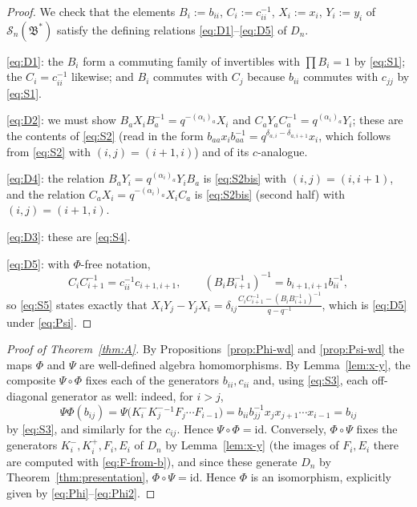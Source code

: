 \documentclass[11pt]{amsart}
\newcommand{\KP}{K^{+}}
\newcommand{\KM}{K^{-}}
\newcommand{\al}{\alpha}
\theoremstyle{plain}
\theoremstyle{definition}
\numberwithin{equation}{section}
\begin{document}
\begin{proof}
We check that the elements
$B_i:=b_{ii}$, $C_i:=c_{ii}^{-1}$, $X_i:=x_i$, $Y_i:=y_i$ of
$\mathscr S_n(\mathfrak B^*)$ satisfy the defining relations
\eqref{eq:D1}--\eqref{eq:D5} of $D_n$.

\eqref{eq:D1}: the $B_i$ form a commuting family of invertibles with
$\prod B_i=1$ by \eqref{eq:S1}; the $C_i=c_{ii}^{-1}$ likewise; and $B_i$
commutes with $C_j$ because $b_{ii}$ commutes with $c_{jj}$ by \eqref{eq:S1}.

\eqref{eq:D2}: we must show $B_aX_iB_a^{-1}=q^{-(\al_i)_a}X_i$ and
$C_aY_aC_a^{-1}=q^{(\al_i)_a}Y_i$; these are the contents of \eqref{eq:S2}
(read in the form $b_{aa}x_ib_{aa}^{-1}=q^{\delta_{a,i}-\delta_{a,i+1}}x_i$,
which follows from \eqref{eq:S2} with $(i,j)=(i+1,i)$) and of its
$c$-analogue.

\eqref{eq:D4}: the relation $B_aY_i=q^{(\al_i)_a}Y_iB_a$ is
\eqref{eq:S2bis} with $(i,j)=(i,i+1)$, and the relation
$C_aX_i=q^{-(\al_i)_a}X_iC_a$ is \eqref{eq:S2bis} (second half) with
$(i,j)=(i+1,i)$.

\eqref{eq:D3}: these are \eqref{eq:S4}.

\eqref{eq:D5}: with $\Phi$-free notation,
\[
C_iC_{i+1}^{-1}=c_{ii}^{-1}c_{i+1,i+1},\qquad
(B_iB_{i+1}^{-1})^{-1}=b_{i+1,i+1}b_{ii}^{-1},
\]
so \eqref{eq:S5} states exactly that
$X_iY_j-Y_jX_i=\delta_{ij}\frac{C_iC_{i+1}^{-1}-(B_iB_{i+1}^{-1})^{-1}}
{q-q^{-1}}$, which is \eqref{eq:D5} under \eqref{eq:Psi}.
\end{proof}

\begin{proof}[Proof of Theorem~\ref{thm:A}]
By Propositions~\ref{prop:Phi-wd} and \ref{prop:Psi-wd} the maps
$\Phi$ and $\Psi$ are well-defined algebra homomorphisms.  By
Lemma~\ref{lem:x-y}, the composite $\Psi\circ\Phi$ fixes each of the
generators $b_{ii},c_{ii}$ and, using \eqref{eq:S3}, each off-diagonal
generator as well: indeed, for $i>j$,
\[
\Psi\Phi(b_{ij})
=\Psi\big(\KM_i\KM_j^{-1}F_j\cdots F_{i-1}\big)
=b_{ii}b_{jj}^{-1}x_jx_{j+1}\cdots x_{i-1}=b_{ij}
\]
by \eqref{eq:S3}, and similarly for the $c_{ij}$.  Hence
$\Psi\circ\Phi=\mathrm{id}$.  Conversely, $\Phi\circ\Psi$ fixes the
generators $\KM_i,\KP_i,F_i,E_i$ of $D_n$ by Lemma~\ref{lem:x-y} (the images
of $F_i,E_i$ there are computed with \eqref{eq:F-from-b}), and since these
generate $D_n$ by Theorem~\ref{thm:presentation}, $\Phi\circ\Psi=\mathrm{id}$.
Hence $\Phi$ is an isomorphism, explicitly given by
\eqref{eq:Phi}--\eqref{eq:Phi2}.
\end{proof}
\end{document}

